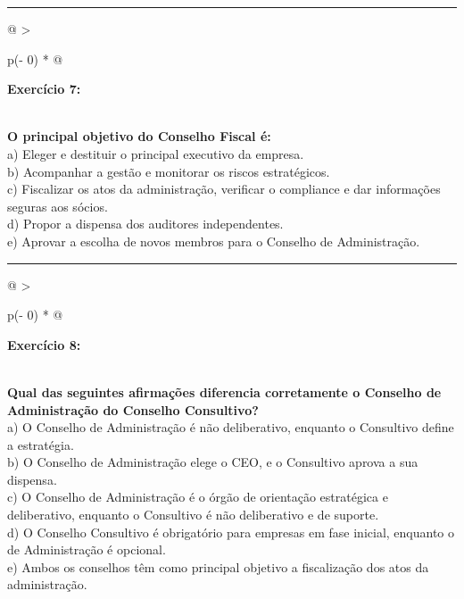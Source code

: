 \documentclass[
]{book}
\begin{document}
\begin{center}\rule{0.5\linewidth}{0.5pt}\end{center}

\begin{longtable}[]{@{}
  >{\raggedright\arraybackslash}p{(\columnwidth - 0\tabcolsep) * }@{}}
\toprule\noalign{}
\begin{minipage}[b]{\linewidth}\raggedright
\textbf{Exercício 7:}
\end{minipage} \\
\midrule\noalign{}
\endhead
\bottomrule\noalign{}
\endlastfoot
\textbf{O principal objetivo do Conselho Fiscal é:} \\
a) Eleger e destituir o principal executivo da empresa. \\
b) Acompanhar a gestão e monitorar os riscos estratégicos. \\
c) Fiscalizar os atos da administração, verificar o compliance e dar informações seguras aos sócios. \\
d) Propor a dispensa dos auditores independentes. \\
e) Aprovar a escolha de novos membros para o Conselho de Administração. \\
\end{longtable}

\begin{center}\rule{0.5\linewidth}{0.5pt}\end{center}

\begin{longtable}[]{@{}
  >{\raggedright\arraybackslash}p{(\columnwidth - 0\tabcolsep) * }@{}}
\toprule\noalign{}
\begin{minipage}[b]{\linewidth}\raggedright
\textbf{Exercício 8:}
\end{minipage} \\
\midrule\noalign{}
\endhead
\bottomrule\noalign{}
\endlastfoot
\textbf{Qual das seguintes afirmações diferencia corretamente o Conselho de Administração do Conselho Consultivo?} \\
a) O Conselho de Administração é não deliberativo, enquanto o Consultivo define a estratégia. \\
b) O Conselho de Administração elege o CEO, e o Consultivo aprova a sua dispensa. \\
c) O Conselho de Administração é o órgão de orientação estratégica e deliberativo, enquanto o Consultivo é não deliberativo e de suporte. \\
d) O Conselho Consultivo é obrigatório para empresas em fase inicial, enquanto o de Administração é opcional. \\
e) Ambos os conselhos têm como principal objetivo a fiscalização dos atos da administração. \\
\end{longtable}
\end{document}
